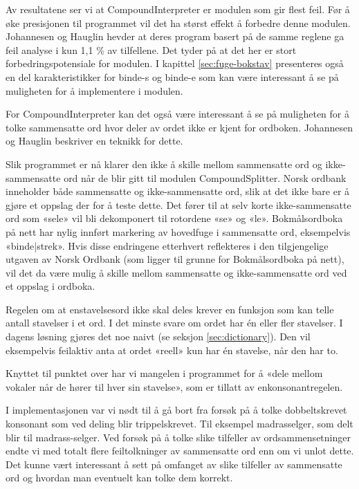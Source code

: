 \begin{items}
\item Av resultatene ser vi at CompoundInterpreter er modulen som gir flest feil. Før å øke presisjonen til programmet vil det ha størst effekt å forbedre denne modulen. Johannesen og Hauglin \cite{johannessen1996automatic} hevder at deres program basert på de samme reglene ga feil analyse i kun 1,1 \% av tilfellene. Det tyder på at det her er stort forbedringspotensiale for modulen. I kapittel \ref{sec:fuge-bokstav} presenteres også en del karakteristikker for binde-s og binde-e som kan være interessant å se på muligheten for å implementere i modulen.
\item For CompoundInterpreter kan det også være interessant å se på muligheten for å tolke sammensatte ord hvor deler av ordet ikke er kjent for ordboken. Johannesen og Hauglin \cite[s. 10]{johannessen1996automatic} beskriver en teknikk for dette.
\item Slik programmet er nå klarer den ikke å skille mellom sammensatte ord og ikke-sammensatte ord når de blir gitt til modulen CompoundSplitter. Norsk ordbank inneholder både sammensatte og ikke-sammensatte ord, slik at det ikke bare er å gjøre et oppslag der for å teste dette. Det fører til at selv korte ikke-sammensatte ord som «sele» vil bli dekomponert til rotordene «se» og «le». Bokmålsordboka på nett  har nylig innført markering av hovedfuge i sammensatte ord, eksempelvis «binde|strek». Hvis disse endringene etterhvert reflekteres i den tilgjengelige utgaven av Norsk Ordbank (som ligger til grunne for Bokmålsordboka på nett), vil det da være mulig å skille mellom sammensatte og ikke-sammensatte ord ved et oppslag i ordboka.
\item Regelen om at enstavelsesord ikke skal deles krever en funksjon som kan telle antall stavelser i et ord. I det minste svare om ordet har én eller fler stavelser. I dagens løsning gjøres det noe naivt (se seksjon \ref{sec:dictionary}). Den vil eksempelvis feilaktiv anta at ordet «reell» kun har én stavelse, når den har to. 
\item Knyttet til punktet over har vi mangelen i programmet for å «dele mellom vokaler når de hører til hver sin stavelse», som er tillatt av enkonsonantregelen. 
\item I implementasjonen var vi nødt til å gå bort fra forsøk på å tolke dobbeltskrevet konsonant som ved deling blir trippelskrevet. Til eksempel madrasselger, som delt blir til madrass-selger. Ved forsøk på å tolke slike tilfeller av ordsammensetninger endte vi med totalt flere feiltolkninger av sammensatte ord enn om vi unlot dette. Det kunne vært interessant å sett på omfanget av slike tilfeller av sammensatte ord og hvordan man eventuelt kan tolke dem korrekt.

\end{items}
